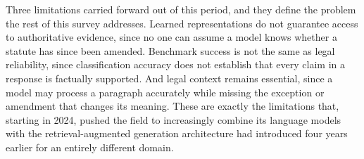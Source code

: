Three limitations carried forward out of this period, and they define the problem the rest of this
survey addresses. Learned representations do not guarantee access to authoritative evidence, since
no one can assume a model knows whether a statute has since been amended. Benchmark success is not
the same as legal reliability, since classification accuracy does not establish that every claim in
a response is factually supported. And legal context remains essential, since a model may process a
paragraph accurately while missing the exception or amendment that changes its meaning. These are
exactly the limitations that, starting in 2024, pushed the field to increasingly combine its
language models with the retrieval-augmented generation architecture \citet{lewis2020} had
introduced four years earlier for an entirely different domain.
